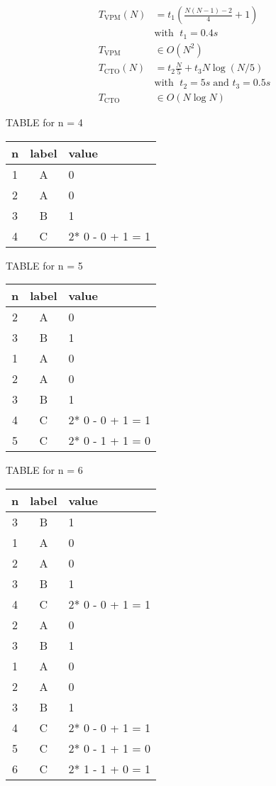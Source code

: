 \documentclass[a4paper]{article}
\begin{document}
\begin{align*}
  T_\text{VPM}(N) &= t_1 \left( \frac{N(N-1) - 2}{4} + 1 \right) \\
  &\text{with } \; t_1 = 0.4s \\
  T_\text{VPM} &\in O(N^2) \\
  T_\text{CTO}(N) &= t_2\frac{N}{5} + t_3N\log(N/5) \\
  &\text{with } \; t_2 = 5s \; \text{and } t_3 = 0.5s \\
  T_\text{CTO} &\in O(N\log N)
\end{align*}

TABLE for n = 4

\begin{tabular}{|c|c|l|}
\hline
n & label & value \\
\hline
1  & A & 0 \\
2  & A & 0 \\
3  & B & 1 \\
4  & C & 2* 0 - 0 + 1 = 1 \\
\hline
\end{tabular}

TABLE for n = 5

\begin{tabular}{|c|c|l|}
\hline
n & label & value \\
\hline
2  & A & 0 \\
3  & B & 1 \\
1  & A & 0 \\
2  & A & 0 \\
3  & B & 1 \\
4  & C & 2* 0 - 0 + 1 = 1 \\
5  & C & 2* 0 - 1 + 1 = 0 \\
\hline
\end{tabular}

TABLE for n = 6

\begin{tabular}{|c|c|l|}
\hline
n & label & value \\
\hline
3  & B & 1 \\
1  & A & 0 \\
2  & A & 0 \\
3  & B & 1 \\
4  & C & 2* 0 - 0 + 1 = 1 \\
2  & A & 0 \\
3  & B & 1 \\
1  & A & 0 \\
2  & A & 0 \\
3  & B & 1 \\
4  & C & 2* 0 - 0 + 1 = 1 \\
5  & C & 2* 0 - 1 + 1 = 0 \\
6  & C & 2* 1 - 1 + 0 = 1 \\
\hline
\end{tabular}
\end{document}
